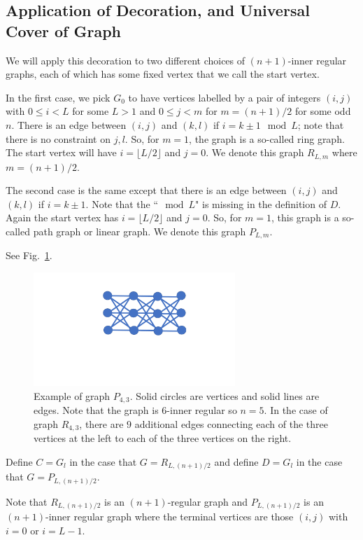 \documentclass[letterpaper,onecolumn]{quantumarticle}
\newcommand{\glen}{L}
\begin{document}
\subsection{Application of Decoration, and Universal Cover of Graph}
\label{applic}
We will apply this decoration to two different choices of $(n+1)$-inner regular graphs, each of which has some fixed vertex that we call the start vertex.

In the first case, we pick $G_0$ to have vertices labelled by a pair of integers $(i,j)$ with
$0\leq i <\glen$ for some $\glen>1$ and $0\leq j <m$ for $m= (n+1)/2$ for some odd $n$.
There is an edge between $(i,j)$ and $(k,l)$ if $i=k\pm 1 \mod \glen$; note that there is no constraint on $j,l$.
So, for $m=1$, the graph is a so-called ring graph.
The start vertex will have $i=\lfloor \glen/2\rfloor $ and $j=0$.
We denote this graph $R_{\glen,m}$ where $m=(n+1)/2$.

The second case is the same except that there is an edge between $(i,j)$ and $(k,l)$ if $i=k\pm 1$.  Note that the ``$\mod \glen$" is missing in the definition of $D$.  
Again the start vertex has $i=\lfloor \glen/2\rfloor $ and $j=0$.
So, for $m=1$, this graph is a so-called path graph or linear graph.
We denote this graph $P_{\glen,m}$.

See Fig.~\ref{figP}.

\begin{figure}
\includegraphics[width=3in]{rp.pdf}
\caption{Example of graph $P_{4,3}$.  Solid circles are vertices and solid lines are edges.  Note that the graph is $6$-inner regular so $n=5$.  In the case of graph $R_{4,3}$, there are $9$ additional edges connecting each of the
three vertices at the left to each of the three vertices on the right.}
\label{figP}
\end{figure}



Define $C=G_l$ in the case that $G=R_{\glen,(n+1)/2}$ and define
$D=G_l$ in the case that $G=P_{\glen,(n+1)/2}$.

Note that $R_{\glen,(n+1)/2}$ is an $(n+1)$-regular graph and $P_{\glen,(n+1)/2}$ is an $(n+1)$-inner regular graph where the terminal vertices are those $(i,j)$ with $i=0$ or $i=\glen-1$.
\end{document}
